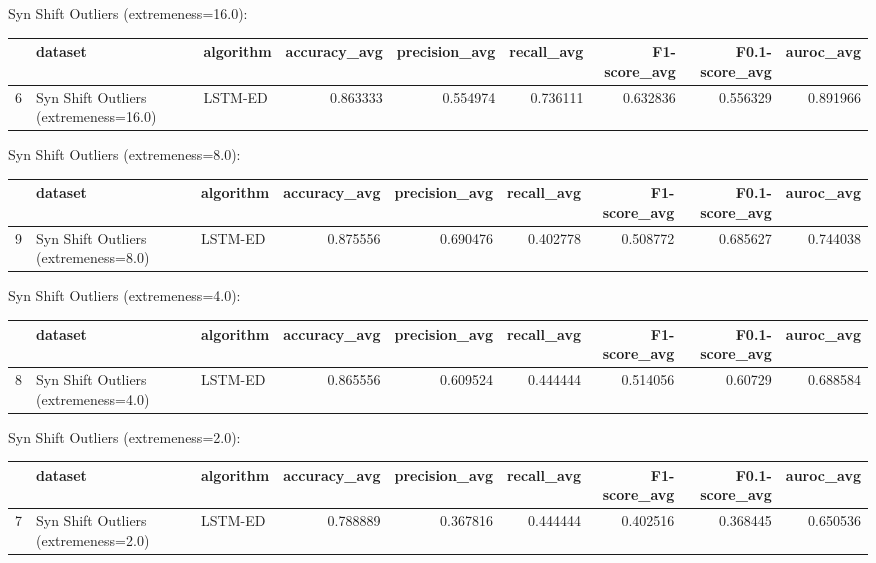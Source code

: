 Syn Shift Outliers (extremeness=16.0):

\begin{tabular}{rllrrrrrr}
\hline
    & dataset                               & algorithm   &   accuracy\_avg &   precision\_avg &   recall\_avg &   F1-score\_avg &   F0.1-score\_avg &   auroc\_avg \\
\hline
  6 & Syn Shift Outliers (extremeness=16.0) & LSTM-ED     &       0.863333 &        0.554974 &     0.736111 &       0.632836 &         0.556329 &    0.891966 \\
\hline
\end{tabular}

Syn Shift Outliers (extremeness=8.0):

\begin{tabular}{rllrrrrrr}
\hline
    & dataset                              & algorithm   &   accuracy\_avg &   precision\_avg &   recall\_avg &   F1-score\_avg &   F0.1-score\_avg &   auroc\_avg \\
\hline
  9 & Syn Shift Outliers (extremeness=8.0) & LSTM-ED     &       0.875556 &        0.690476 &     0.402778 &       0.508772 &         0.685627 &    0.744038 \\
\hline
\end{tabular}

Syn Shift Outliers (extremeness=4.0):

\begin{tabular}{rllrrrrrr}
\hline
    & dataset                              & algorithm   &   accuracy\_avg &   precision\_avg &   recall\_avg &   F1-score\_avg &   F0.1-score\_avg &   auroc\_avg \\
\hline
  8 & Syn Shift Outliers (extremeness=4.0) & LSTM-ED     &       0.865556 &        0.609524 &     0.444444 &       0.514056 &          0.60729 &    0.688584 \\
\hline
\end{tabular}

Syn Shift Outliers (extremeness=2.0):

\begin{tabular}{rllrrrrrr}
\hline
    & dataset                              & algorithm   &   accuracy\_avg &   precision\_avg &   recall\_avg &   F1-score\_avg &   F0.1-score\_avg &   auroc\_avg \\
\hline
  7 & Syn Shift Outliers (extremeness=2.0) & LSTM-ED     &       0.788889 &        0.367816 &     0.444444 &       0.402516 &         0.368445 &    0.650536 \\
\hline
\end{tabular}

